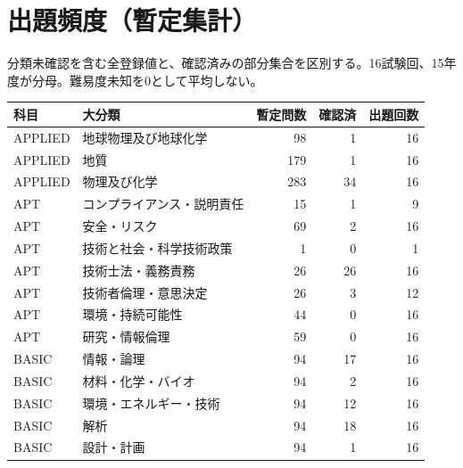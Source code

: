 \chapter{出題頻度（暫定集計）}
分類未確認を含む全登録値と、確認済みの部分集合を区別する。16試験回、15年度が分母。難易度未知を0として平均しない。
\begin{longtable}{p{.16\linewidth}p{.42\linewidth}rrr}
科目 & 大分類 & 暫定問数 & 確認済 & 出題回数\\\hline
APPLIED & 地球物理及び地球化学 & 98 & 1 & 16\\
APPLIED & 地質 & 179 & 1 & 16\\
APPLIED & 物理及び化学 & 283 & 34 & 16\\
APT & コンプライアンス・説明責任 & 15 & 1 & 9\\
APT & 安全・リスク & 69 & 2 & 16\\
APT & 技術と社会・科学技術政策 & 1 & 0 & 1\\
APT & 技術士法・義務責務 & 26 & 26 & 16\\
APT & 技術者倫理・意思決定 & 26 & 3 & 12\\
APT & 環境・持続可能性 & 44 & 0 & 16\\
APT & 研究・情報倫理 & 59 & 0 & 16\\
BASIC & 情報・論理 & 94 & 17 & 16\\
BASIC & 材料・化学・バイオ & 94 & 2 & 16\\
BASIC & 環境・エネルギー・技術 & 94 & 12 & 16\\
BASIC & 解析 & 94 & 18 & 16\\
BASIC & 設計・計画 & 94 & 1 & 16\\
\end{longtable}
